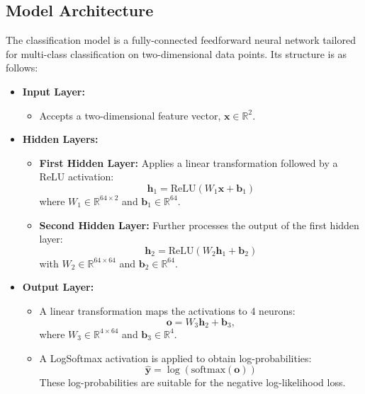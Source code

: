\documentclass{article}
\begin{document}
\subsection*{Model Architecture}
The classification model is a fully-connected feedforward neural network tailored for multi-class classification on two-dimensional data points. Its structure is as follows:
\begin{itemize}
    \item \textbf{Input Layer:}  
    \begin{itemize}
        \item Accepts a two-dimensional feature vector, \(\mathbf{x} \in \mathbb{R}^2\).
    \end{itemize}
    \item \textbf{Hidden Layers:}
    \begin{itemize}
        \item \textbf{First Hidden Layer:}  
        Applies a linear transformation followed by a ReLU activation:
        \[
        \mathbf{h}_1 = \text{ReLU}(W_1 \mathbf{x} + \mathbf{b}_1)
        \]
        where \(W_1 \in \mathbb{R}^{64 \times 2}\) and \(\mathbf{b}_1 \in \mathbb{R}^{64}\).
        \item \textbf{Second Hidden Layer:}  
        Further processes the output of the first hidden layer:
        \[
        \mathbf{h}_2 = \text{ReLU}(W_2 \mathbf{h}_1 + \mathbf{b}_2)
        \]
        with \(W_2 \in \mathbb{R}^{64 \times 64}\) and \(\mathbf{b}_2 \in \mathbb{R}^{64}\).
    \end{itemize}
    \item \textbf{Output Layer:}
    \begin{itemize}
        \item A linear transformation maps the activations to 4 neurons:
        \[
        \mathbf{o} = W_3 \mathbf{h}_2 + \mathbf{b}_3,
        \]
        where \(W_3 \in \mathbb{R}^{4 \times 64}\) and \(\mathbf{b}_3 \in \mathbb{R}^{4}\).
        \item A LogSoftmax activation is applied to obtain log-probabilities:
        \[
        \hat{\mathbf{y}} = \log\left(\text{softmax}(\mathbf{o})\right)
        \]
        These log-probabilities are suitable for the negative log-likelihood loss.
    \end{itemize}
\end{itemize}
\end{document}
